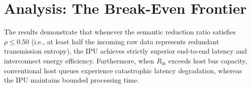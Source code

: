\section{Analysis: The Break-Even Frontier}
The results demonstrate that whenever the semantic reduction ratio satisfies $\rho \le 0.50$ (i.e., at least half the incoming raw data represents redundant transmission entropy), the IPU achieves strictly superior end-to-end latency and interconnect energy efficiency. Furthermore, when $R_{\text{in}}$ exceeds host bus capacity, conventional host queues experience catastrophic latency degradation, whereas the IPU maintains bounded processing time.
